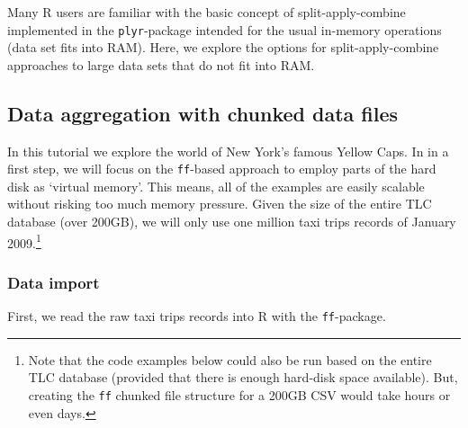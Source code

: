 \documentclass[
  12pt,
]{style/krantz}
\begin{document}
Many R users are familiar with the basic concept of split-apply-combine implemented in the \texttt{plyr}-package intended for the usual in-memory operations (data set fits into RAM). Here, we explore the options for split-apply-combine approaches to large data sets that do not fit into RAM.

\hypertarget{data-aggregation-with-chunked-data-files}{%
\subsection{Data aggregation with chunked data files}\label{data-aggregation-with-chunked-data-files}}

In this tutorial we explore the world of New York's famous Yellow Caps. In in a first step, we will focus on the \texttt{ff}-based approach to employ parts of the hard disk as `virtual memory'. This means, all of the examples are easily scalable without risking too much memory pressure. Given the size of the entire TLC database (over 200GB), we will only use one million taxi trips records of January 2009.\footnote{Note that the code examples below could also be run based on the entire TLC database (provided that there is enough hard-disk space available). But, creating the \texttt{ff} chunked file structure for a 200GB CSV would take hours or even days.}

\hypertarget{data-import-2}{%
\subsubsection{Data import}\label{data-import-2}}

First, we read the raw taxi trips records into R with the \texttt{ff}-package.
\end{document}
